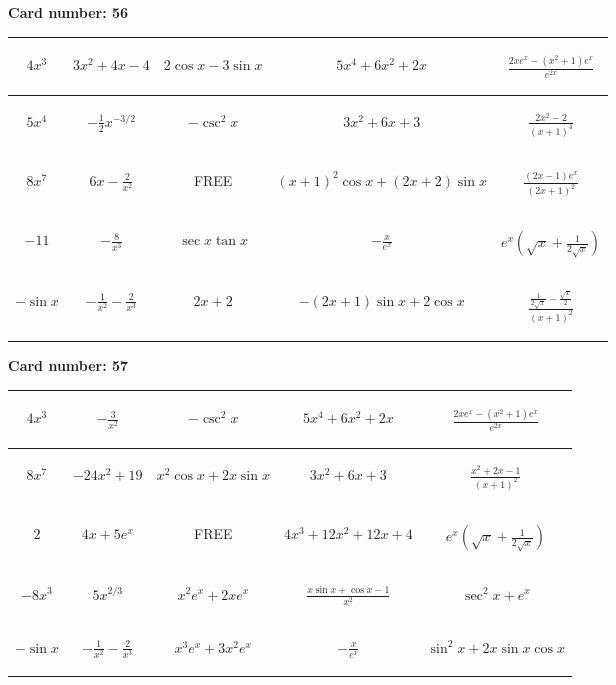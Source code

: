 \documentclass{article}
\newcommand{\entry}[1]{\begin{minipage}[t][2.75cm][t]{4cm} \vspace{1cm} \begin{center}#1\end{center} \end{minipage}}
\newcommand{\freespace}{\entry{FREE}}
\newcommand{\cardnumber}[1]{\noindent \textbf{Card number: #1} \bigskip}
\begin{document}
\pagebreak

\cardnumber{56}
\begin{center}
\begin{tabular}{|*{5}{c|}}
    \hline
    \entry{$4x^3$} & \entry{$3x^2 + 4x - 4$} & \entry{$2 \cos x - 3 \sin x$} & \entry{$5x^4 + 6x^2 + 2x$} & \entry{$\frac{2x e^x - (x^2 + 1) e^x}{e^{2x}}$} \\ \hline
    \entry{$5x^4$} & \entry{$-\frac{1}{2} x^{-3/2}$} & \entry{$-\csc^2 x$} & \entry{$3x^2 + 6x + 3$} & \entry{$\frac{2x^2 - 2}{(x + 1)^4}$} \\ \hline
    \entry{$8x^7$} & \entry{$6x - \frac{2}{x^2}$} & \freespace & \entry{$(x + 1)^2 \cos x + (2x + 2) \sin x$} & \entry{$\frac{(2x - 1) e^x}{(2x + 1)^2}$} \\ \hline
    \entry{$-11$} & \entry{$-\frac{8}{x^3}$} & \entry{$\sec x \tan x$} & \entry{$-\frac{x}{e^x}$} & \entry{$e^x \left(\sqrt{x} + \frac{1}{2\sqrt{x}}\right)$} \\ \hline
    \entry{$-\sin x$} & \entry{$-\frac{1}{x^2} - \frac{2}{x^3}$} & \entry{$2x + 2$} & \entry{$-(2x + 1) \sin x + 2 \cos x$} & \entry{$\frac{\frac{1}{2 \sqrt{x}} - \frac{\sqrt{x}}{2}}{(x + 1)^2}$} \\ \hline
\end{tabular}
\end{center}

\pagebreak

\cardnumber{57}
\begin{center}
\begin{tabular}{|*{5}{c|}}
    \hline
    \entry{$4x^3$} & \entry{$-\frac{3}{x^2}$} & \entry{$-\csc^2 x$} & \entry{$5x^4 + 6x^2 + 2x$} & \entry{$\frac{2x e^x - (x^2 + 1) e^x}{e^{2x}}$} \\ \hline
    \entry{$8x^7$} & \entry{$-24x^2 + 19$} & \entry{$x^2 \cos x + 2x \sin x$} & \entry{$3x^2 + 6x + 3$} & \entry{$\frac{x^2 + 2x - 1}{(x + 1)^2}$} \\ \hline
    \entry{$2$} & \entry{$4x + 5e^x$} & \freespace & \entry{$4x^3 + 12x^2 + 12x + 4$} & \entry{$e^x \left(\sqrt{x} + \frac{1}{2\sqrt{x}}\right)$} \\ \hline
    \entry{$-8x^3$} & \entry{$5x^{2/3}$} & \entry{$x^2 e^x + 2x e^x$} & \entry{$\frac{x \sin x + \cos x - 1}{x^2}$} & \entry{$\sec^2 x + e^x$} \\ \hline
    \entry{$-\sin x$} & \entry{$-\frac{1}{x^2} - \frac{2}{x^3}$} & \entry{$x^3 e^x + 3x^2 e^x$} & \entry{$-\frac{x}{e^x}$} & \entry{$\sin^2 x + 2x \sin x \cos x$} \\ \hline
\end{tabular}
\end{center}
\end{document}
